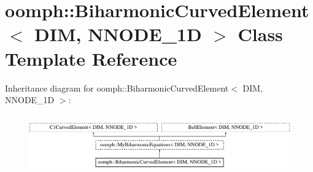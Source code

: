 \hypertarget{classoomph_1_1BiharmonicCurvedElement}{}\section{oomph\+:\+:Biharmonic\+Curved\+Element$<$ D\+IM, N\+N\+O\+D\+E\+\_\+1D $>$ Class Template Reference}
\label{classoomph_1_1BiharmonicCurvedElement}
Inheritance diagram for oomph\+:\+:Biharmonic\+Curved\+Element$<$ D\+IM, N\+N\+O\+D\+E\+\_\+1D $>$\+:\begin{figure}[H]
\begin{center}
\leavevmode
\includegraphics[height=2.500000cm]{classoomph_1_1BiharmonicCurvedElement}
\end{center}
\end{figure}
